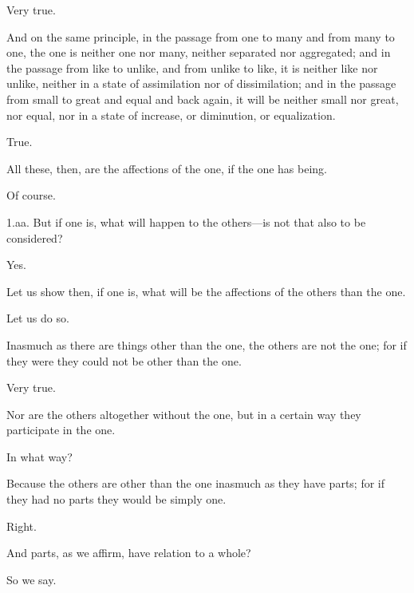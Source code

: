 \documentclass[11pt,letter]{article}
\begin{document}
\par  Very true.

\par  And on the same principle, in the passage from one to many and from many to one, the one is neither one nor many, neither separated nor aggregated; and in the passage from like to unlike, and from unlike to like, it is neither like nor unlike, neither in a state of assimilation nor of dissimilation; and in the passage from small to great and equal and back again, it will be neither small nor great, nor equal, nor in a state of increase, or diminution, or equalization.

\par  True.

\par  All these, then, are the affections of the one, if the one has being.

\par  Of course.

\par  1.aa. But if one is, what will happen to the others—is not that also to be considered?

\par  Yes.

\par  Let us show then, if one is, what will be the affections of the others than the one.

\par  Let us do so.

\par  Inasmuch as there are things other than the one, the others are not the one; for if they were they could not be other than the one.

\par  Very true.

\par  Nor are the others altogether without the one, but in a certain way they participate in the one.

\par  In what way?

\par  Because the others are other than the one inasmuch as they have parts; for if they had no parts they would be simply one.

\par  Right.

\par  And parts, as we affirm, have relation to a whole?

\par  So we say.
\end{document}

